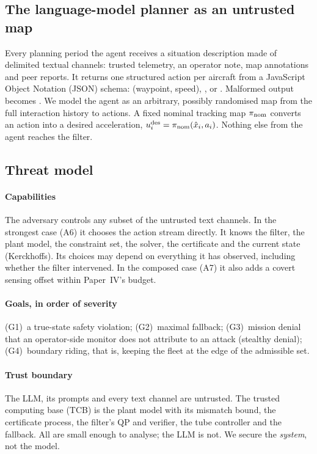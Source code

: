 \subsection{The language-model planner as an untrusted map}
Every planning period the agent receives a situation description made of
delimited textual channels: trusted telemetry, an operator note, map
annotations and peer reports. It returns one structured action per
aircraft from a JavaScript Object Notation (JSON) schema: 
(waypoint, speed), , or . Malformed output becomes
. We model the agent as an arbitrary, possibly randomised map
from the full interaction history to actions. A fixed nominal tracking map
$\pi_{\mathrm{nom}}$ converts an action into a desired acceleration,
$u^{\mathrm{des}}_i=\pi_{\mathrm{nom}}(\hat x_i,a_i)$. Nothing else from the agent reaches the
filter.

\subsection{Threat model}\label{sec:threat}
\paragraph{Capabilities} The adversary controls any subset of the
untrusted text channels. In the strongest case (A6) it chooses the action
stream directly. It knows the filter, the plant model, the constraint set,
the solver, the certificate and the current state (Kerckhoffs). Its choices
may depend on everything it has observed, including whether the filter
intervened. In the composed case (A7) it also adds a covert sensing offset
within Paper~IV's budget.
\paragraph{Goals, in order of severity} (G1)~a true-state safety violation;
(G2)~maximal fallback; (G3)~mission denial that an operator-side monitor
does not attribute to an attack (stealthy denial); (G4)~boundary riding,
that is, keeping the fleet at the edge of the admissible set.
\paragraph{Trust boundary} The LLM, its prompts and every text channel are
untrusted. The trusted computing base (TCB) is the plant model with its
mismatch bound, the certificate process, the filter's QP and verifier,
the tube controller and the fallback. All are small enough to analyse; the
LLM is not. We secure the \emph{system}, not the model.
